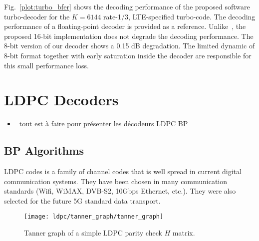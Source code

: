 Fig.~\ref{plot:turbo_bfer} shows the decoding performance of the proposed
software turbo-decoder for the $K = 6144$ rate-1/3, LTE-specified turbo-code.
The decoding performance of a floating-point decoder is provided as a reference.
Unlike~\cite{Wu2013}, the proposed 16-bit implementation does not degrade the
decoding performance. The 8-bit version of our decoder shows a 0.15 dB
degradation. The limited dynamic of 8-bit format together with early saturation
inside the decoder are responsible for this small performance loss.

\section{LDPC Decoders}

\begin{itemize}
  \item \xmark~tout est à faire pour présenter les décodeurs LDPC BP
\end{itemize}

\subsection{BP Algorithms}

LDPC codes is a family of channel codes that is well spread in current digital
communication systems. They have been chosen in many communication standards
(Wifi, WiMAX, DVB-S2, 10Gbps Ethernet, etc.). They were also selected for the
future 5G standard data transport.

\begin{figure}[htp]
  \centering
  \texttt{[image: ldpc/tanner\_graph/tanner\_graph]}
  \caption{Tanner graph of a simple LDPC parity check $H$ matrix.}
  \label{fig:ldpc}
\end{figure}

